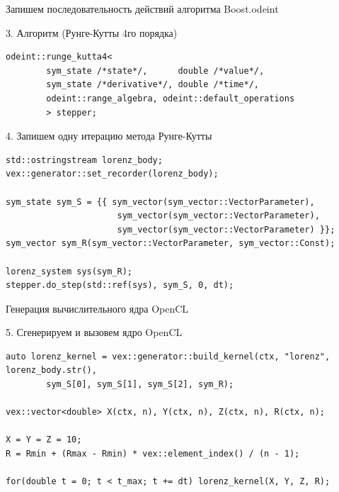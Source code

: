 \documentclass[@BEAMER_OPTIONS@]{beamer}
\begin{document}
\begin{frame}[fragile]{Запишем последовательность действий алгоритма Boost.odeint}
    \begin{exampleblock}{3. Алгоритм (Рунге-Кутты 4го порядка)}
        \begin{lstlisting}[firstnumber=last]
odeint::runge_kutta4<
        sym_state /*state*/,      double /*value*/,
        sym_state /*derivative*/, double /*time*/,
        odeint::range_algebra, odeint::default_operations
        > stepper;
        \end{lstlisting}
    \end{exampleblock}

    \begin{exampleblock}{4. Запишем одну итерацию метода Рунге-Кутты}
        \begin{lstlisting}[firstnumber=last]
std::ostringstream lorenz_body;
vex::generator::set_recorder(lorenz_body);

sym_state sym_S = {{ sym_vector(sym_vector::VectorParameter),
                      sym_vector(sym_vector::VectorParameter),
                      sym_vector(sym_vector::VectorParameter) }};
sym_vector sym_R(sym_vector::VectorParameter, sym_vector::Const);

lorenz_system sys(sym_R);
stepper.do_step(std::ref(sys), sym_S, 0, dt);
        \end{lstlisting}
    \end{exampleblock}
\end{frame}


\begin{frame}[fragile]{Генерация вычислительного ядра OpenCL}
    \begin{exampleblock}{5. Сгенерируем и вызовем ядро OpenCL}
        \begin{lstlisting}[firstnumber=last]
auto lorenz_kernel = vex::generator::build_kernel(ctx, "lorenz", lorenz_body.str(),
        sym_S[0], sym_S[1], sym_S[2], sym_R);

vex::vector<double> X(ctx, n), Y(ctx, n), Z(ctx, n), R(ctx, n);

X = Y = Z = 10;
R = Rmin + (Rmax - Rmin) * vex::element_index() / (n - 1);

for(double t = 0; t < t_max; t += dt) lorenz_kernel(X, Y, Z, R);
        \end{lstlisting}
    \end{exampleblock}
\end{frame}
\end{document}
